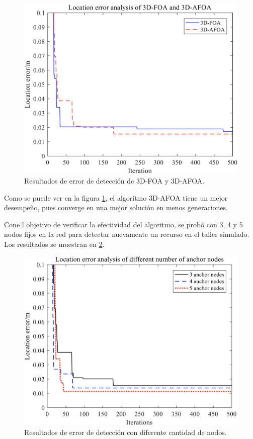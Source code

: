 \documentclass[letterpaper]{report}
\begin{document}
    \begin{figure}[ht!]
      \includegraphics[width=\textwidth]{location-error-3d-foa-3d-afoa_1.png}
      \centering
      \caption{Resultados de error de detección de 3D-FOA y 3D-AFOA.}
      \label{fig:location-error-3d-foa-3d-afoa_1}
      \centering
    \end{figure}

    Como se puede ver en la figura \ref{fig:location-error-3d-foa-3d-afoa_1}, el
    algoritmo 3D-AFOA tiene un mejor desempeño, pues converge en una mejor
    solución en menos generaciones. 

    Cone l objetivo de verificar la efectividad del algoritmo, se probó con 3, 4
    y 5 nodos fijos en la red para detectar nuevamente un recurso en el taller
    simulado. Los resultados se muestran en \ref{fig:location-error-3d-afoa_2}.

    \begin{figure}[ht!]
      \includegraphics[width=\textwidth]{location-error-3d-afoa_2.png}
      \centering
      \caption{Resultados de error de detección con diferente cantidad de
        nodos.}
      \label{fig:location-error-3d-afoa_2}
      \centering
    \end{figure}
\end{document}
